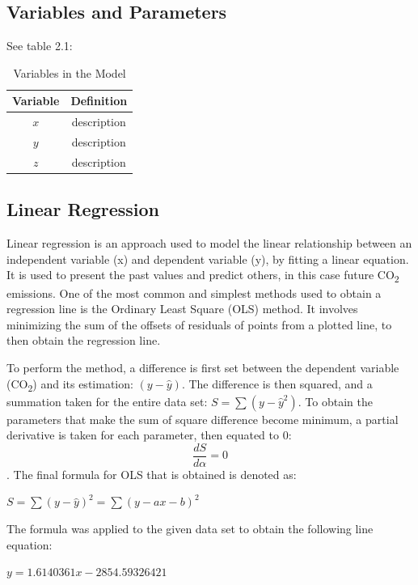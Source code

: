 \documentclass{mcmthesis}
\begin{document}
    \subsection{Variables and Parameters}
    See table 2.1:
    \begin{table}[h!]
        \centering
        \begin{tabular}{cc}
            \toprule
            Variable & Definition      \\
            \midrule
            $x$      & description     \\
            $y$      & description     \\
            $z$      & description     \\
            \bottomrule
        \end{tabular}
        \caption{Variables in the Model}
        \label{tab:my_label}
    \end{table}

    \subsection{Linear Regression}
    Linear regression is an approach used to model the linear relationship between an independent variable (x) and dependent variable (y), by fitting a linear equation. It is used to present the past values and predict others, in this case future CO\textsubscript{2} emissions. One of the most common and simplest methods used to obtain a regression line is the Ordinary Least Square (OLS) method. It involves minimizing the sum of the offsets of residuals of points from a plotted line, to then obtain the regression line. 

    To perform the method, a difference is first set between the dependent variable (CO\textsubscript{2}) and its estimation: ${(y - \hat{y})}$. The difference is then squared, and a summation taken for the entire data set: ${\displaystyle S = \sum (y - \hat{y}^2)}$. To obtain the parameters that make the sum of square difference become minimum, a partial derivative is taken for each parameter, then equated to 0: $${\displaystyle \frac{d S}{d \alpha} = 0}$$. The final formula for OLS that is obtained is denoted as:
    
    ${S = \sum{(y - \hat{y})^2} = \sum{(y - ax - b)^2}}$
    
    The formula was applied to the given data set to obtain the following line equation:
    
    ${y = 1.6140361 x - 2854.59326421}$
    
\end{document}

